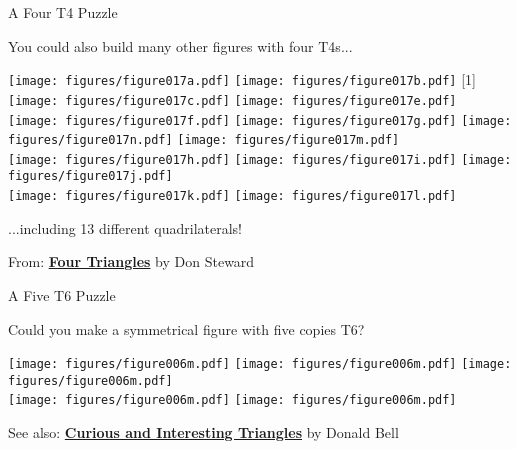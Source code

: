 \documentclass[14pt]{beamer}
\begin{document}
    \begin{frame}{A Four T4 Puzzle}
        \begin{center}
            You could also build many other figures with four T4s...
    
            \bigskip
    
            \texttt{[image: figures/figure017a.pdf]}\;\quad
            \texttt{[image: figures/figure017b.pdf]}\;\;
            \scalebox{-1}[1]{\texttt{[image: figures/figure017c.pdf]}}\;\quad
            \texttt{[image: figures/figure017e.pdf]}\\[-1ex]
            \texttt{[image: figures/figure017f.pdf]}\;\quad
            \texttt{[image: figures/figure017g.pdf]}\;\quad
            \texttt{[image: figures/figure017n.pdf]}
            \texttt{[image: figures/figure017m.pdf]}\\[2ex]
            \texttt{[image: figures/figure017h.pdf]}\;\quad
            \texttt{[image: figures/figure017i.pdf]}\;\quad
            \texttt{[image: figures/figure017j.pdf]}\\[2ex]
            \texttt{[image: figures/figure017k.pdf]}\;\quad
            \texttt{[image: figures/figure017l.pdf]}\;\quad
    
            \bigskip
    
            ...including 13 different quadrilaterals!\bigskip
    
            {\footnotesize From: \textbf{\href{donsteward.blogspot.com.es/2012/03/four-triangles.html}{Four Triangles}} by Don Steward}
        \end{center}
    \end{frame}


    \begin{frame}{A Five T6 Puzzle}
        \begin{center}
            Could you make a symmetrical figure with five copies T6?

            \bigskip\bigskip

            \texttt{[image: figures/figure006m.pdf]}\qquad
            \texttt{[image: figures/figure006m.pdf]}\qquad
            \texttt{[image: figures/figure006m.pdf]}\\[3ex]\qquad
            \texttt{[image: figures/figure006m.pdf]}\qquad
            \texttt{[image: figures/figure006m.pdf]}

            \bigskip\medskip

            {\footnotesize See also: \textbf{\href{https://mathsjam.com/assets/talks/2015/DonaldBell-CuriousTriangles.pdf}{Curious and Interesting Triangles}} by Donald Bell}
        \end{center}
    \end{frame}
\end{document}
